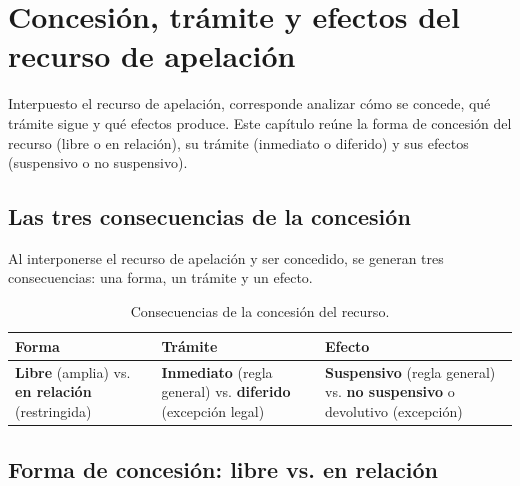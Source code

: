 \documentclass[12pt,oneside]{book}
\begin{document}
\chapter[Concesión, trámite y efectos de la apelación]{Concesión, trámite y efectos del recurso de apelación}\label{cap:concesion}

Interpuesto el recurso de apelación, corresponde analizar cómo se concede, qué trámite sigue y qué efectos produce. Este capítulo reúne la forma de concesión del recurso (libre o en relación), su trámite (inmediato o diferido) y sus efectos (suspensivo o no suspensivo).

\section{Las tres consecuencias de la concesión}

Al interponerse el recurso de apelación y ser concedido, se generan tres consecuencias: una forma, un trámite y un efecto.

\begin{table}[H]
\centering
\begin{tabularx}{\textwidth}{
    >{\raggedright\arraybackslash}X
    >{\raggedright\arraybackslash}X
    >{\raggedright\arraybackslash}X
}
\toprule
\textbf{Forma} & \textbf{Trámite} & \textbf{Efecto} \\
\midrule
\textbf{Libre} (amplia) vs. \textbf{en relación} (restringida) &
\textbf{Inmediato} (regla general) vs. \textbf{diferido} (excepción legal) &
\textbf{Suspensivo} (regla general) vs. \textbf{no suspensivo} o devolutivo (excepción) \\
\bottomrule
\end{tabularx}
\caption{Consecuencias de la concesión del recurso.}
\end{table}

\section{Forma de concesión: libre vs. en relación}
\end{document}
